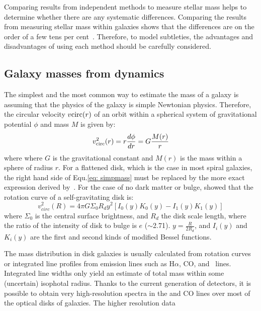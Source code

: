 Comparing results from independent methods to measure stellar mass helps to determine whether there are any systematic differences.
Comparing the results from measuring stellar mass within galaxies shows that the differences are on the order of a few tens per cent~\citep{McLaughlin05}.
Therefore, to model subtleties, the advantages and disadvantages of using each method should be carefully considered. 


\subsection{Galaxy masses from dynamics}

The simplest and the most common way to estimate the mass of a galaxy is assuming that the physics of the galaxy is simple Newtonian physics.
Therefore, the circular velocity $v{\rm circ}(r)$ of an orbit within a spherical system of gravitational potential $\phi$ and mass $M$ is given by:
\begin{equation}
\label{eq: simpmass}
v^2_{\rm circ}(r)=r\frac{d\phi}{dr} = G\frac{M(r)}{r}
\end{equation}
where where $G$ is the gravitational constant and $M(r)$ is the mass within a sphere of radius $r$. 
For a flattened disk, which is the case in most spiral galaxies, the right hand side of Equ.\ref{eq: simpmass} must be replaced by the more exact expression derived by~\cite{Freeman70}. 
For the case of no dark matter or bulge, \cite{Freeman70} showed that the rotation curve of a self-gravitating disk is:
\begin{equation}
v^2_{circ}(R)= 4\pi G \Sigma_{0}R_{d} y^2[I_0(y)K_0(y) - I_1(y)K_1(y)]
\end{equation}
where $\Sigma_0$ is the central surface brightness, and $R_d$ the disk scale length, where the ratio of the intensity of disk to bulge is $e$ ($\sim$2.71).  %
$y=\frac{R}{2R_d}$, and $I_i(y)$ and $K_i(y)$ are the first and second kinds of modified Bessel functions. 


The mass distribution in disk galaxies is usually calculated from rotation curves or integrated line profiles from emission lines such as H${\alpha}$, CO, and \hi~lines. 
Integrated line widths only yield an estimate of total mass within some (uncertain) isophotal radius.
Thanks to the current generation of detectors, it is possible to obtain very high-resolution spectra in the \halpha and CO lines over most of the optical disks of galaxies.
The higher resolution data %


